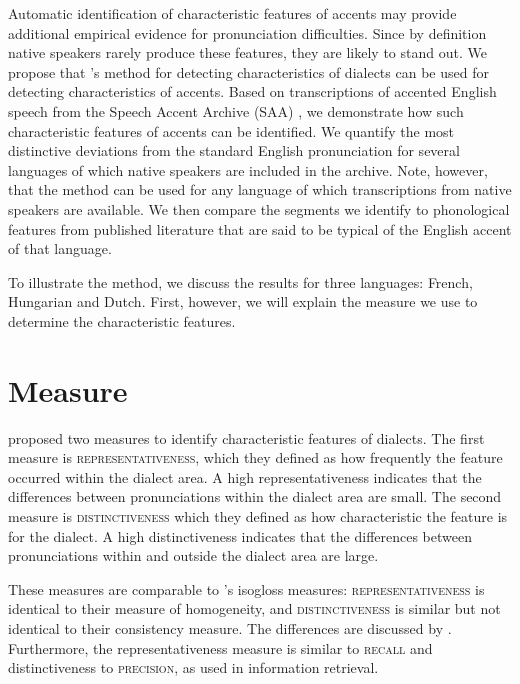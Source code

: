 \documentclass[output=paper]{LSP/langsci}
\begin{document}
Automatic identification of characteristic features of accents may provide additional empirical evidence for pronunciation difficulties. Since by definition native speakers rarely produce these features, they are likely to stand out. We propose that \citet{prokic_detecting_2012}'s method for detecting characteristics of dialects can be used for detecting characteristics of accents. Based on transcriptions of accented English speech from the Speech Accent Archive (SAA) \citep{weinberger_speech_2011}, we demonstrate how such characteristic features of accents can be identified. We quantify the most distinctive deviations from the standard English pronunciation for several languages of which native speakers are included in the archive. Note, however, that the method can be used for any language of which transcriptions from native speakers are available. We then compare the segments we identify to phonological features from published literature that are said to be typical of the English accent of that language.

To illustrate the method, we discuss the results for three languages: French, Hungarian and Dutch. First, however, we will explain the measure we use to determine the characteristic features.

\section{Measure}
\label{s:measure}
\citet{wieling_bipartite_2011} proposed two measures to identify characteristic features of dialects. The first measure is \textsc{representativeness}, which they defined as how frequently the feature occurred within the dialect area. A high representativeness indicates that the differences between pronunciations within the dialect area are small. The second measure is \textsc{distinctiveness} which they defined as how characteristic the feature is for the dialect. A high distinctiveness indicates that the differences between pronunciations within and outside the dialect area are large. 

These measures are comparable to \citet[p.43]{labov_atlas_2006}'s isogloss measures: \textsc{representativeness} is identical to their measure of homogeneity, and \textsc{distinctiveness} is similar but not identical to their consistency measure. The differences are discussed by \citet{wieling_analyzing_2014}. Furthermore, the representativeness measure is similar to \textsc{recall} and distinctiveness to \textsc{precision}, as used in information retrieval.
\end{document}
